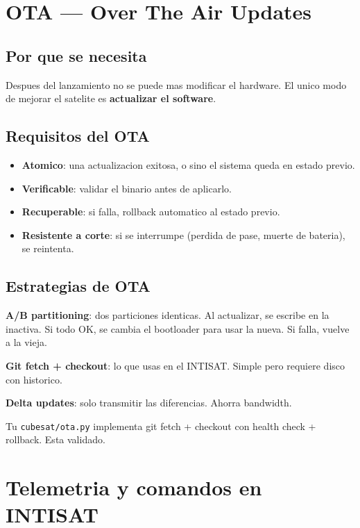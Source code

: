 \documentclass[11pt,a4paper,oneside,openright]{book}
\begin{document}
\chapter{OTA --- Over The Air Updates}

\section{Por que se necesita}

Despues del lanzamiento no se puede mas modificar el hardware. El unico
modo de mejorar el satelite es \textbf{actualizar el software}.

\section{Requisitos del OTA}

\begin{itemize}[leftmargin=2em]
  \item \textbf{Atomico}: una actualizacion exitosa, o sino el sistema
        queda en estado previo.
  \item \textbf{Verificable}: validar el binario antes de aplicarlo.
  \item \textbf{Recuperable}: si falla, rollback automatico al estado
        previo.
  \item \textbf{Resistente a corte}: si se interrumpe (perdida de pase,
        muerte de bateria), se reintenta.
\end{itemize}

\section{Estrategias de OTA}

\textbf{A/B partitioning}: dos particiones identicas. Al actualizar,
se escribe en la inactiva. Si todo OK, se cambia el bootloader para usar
la nueva. Si falla, vuelve a la vieja.

\textbf{Git fetch + checkout}: lo que usas en el INTISAT. Simple pero
requiere disco con historico.

\textbf{Delta updates}: solo transmitir las diferencias. Ahorra bandwidth.

\begin{payload}
Tu \texttt{cubesat/ota.py} implementa git fetch + checkout con health
check + rollback. Esta validado.
\end{payload}

\chapter{Telemetria y comandos en INTISAT}
\end{document}
